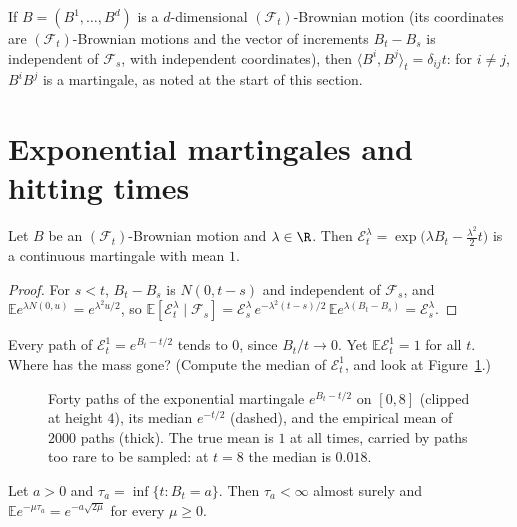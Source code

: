 \begin{example}\label{ex:ddimbm}
If $B=(B^1,\dots,B^d)$ is a $d$-dimensional $(\mathcal F_t)$-Brownian motion (its coordinates are $(\mathcal F_t)$-Brownian motions and the vector of increments $B_t-B_s$ is independent of $\mathcal F_s$, with
independent coordinates), then $\langle B^i,B^j\rangle_t=\delta_{ij}t$: for $i\ne j$, $B^iB^j$ is a martingale, as noted at the start of this section.
\end{example}

\section{Exponential martingales and hitting times}

\begin{proposition}\label{prop:expmart}
Let $B$ be an $(\mathcal F_t)$-Brownian motion and $\lambda\in\R$. Then $\mathcal E^\lambda_t=\exp\bigl(\lambda B_t-\frac{\lambda^2}2t\bigr)$ is a continuous martingale with mean $1$.
\end{proposition}

\begin{proof}
For $s<t$, $B_t-B_s$ is $N(0,t-s)$ and independent of $\mathcal F_s$, and $\mathbb Ee^{\lambda N(0,u)}=e^{\lambda^2u/2}$, so
$\mathbb E[\mathcal E^\lambda_t\mid\mathcal F_s]=\mathcal E^\lambda_s\,e^{-\lambda^2(t-s)/2}\,\mathbb Ee^{\lambda(B_t-B_s)}=\mathcal E^\lambda_s$.
\end{proof}

\begin{think}
Every path of $\mathcal E^1_t=e^{B_t-t/2}$ tends to $0$, since $B_t/t\to0$. Yet $\mathbb E\mathcal E^1_t=1$ for all $t$. Where has the mass gone? (Compute the median of $\mathcal E^1_t$, and look at
Figure~\ref{fig:expmart}.)
\end{think}

\begin{figure}[ht]
\centering
{}
\caption{Forty paths of the exponential martingale $e^{B_t-t/2}$ on $[0,8]$ (clipped at height $4$), its median $e^{-t/2}$ (dashed), and the empirical mean of $2000$ paths (thick). The true mean is $1$
at all times, carried by paths too rare to be sampled: at $t=8$ the median is $0.018$.}
\label{fig:expmart}
\end{figure}

\begin{corollary}\label{cor:hitlaplace}
Let $a>0$ and $\tau_a=\inf\{t:B_t=a\}$. Then $\tau_a<\infty$ almost surely and $\mathbb Ee^{-\mu\tau_a}=e^{-a\sqrt{2\mu}}$ for every $\mu\ge0$.
\end{corollary}

